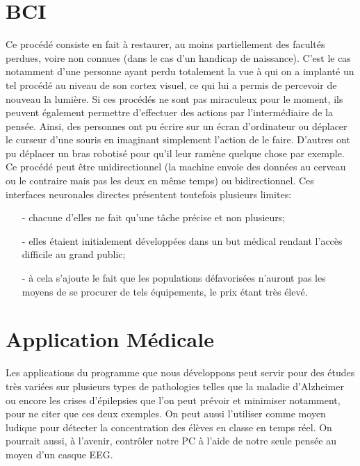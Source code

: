 	\section{BCI} %
		Ce procédé consiste en fait à restaurer, au moins partiellement des facultés perdues, voire non connues (dans le cas d'un handicap de naissance). C'est le cas notamment d'une personne ayant perdu totalement la vue à qui on a implanté un tel procédé au niveau de son cortex visuel, ce qui lui a permis de percevoir de nouveau la lumière. Si ces procédés ne sont pas miraculeux pour le moment, ils peuvent également permettre d'effectuer des actions par l'intermédiaire de la pensée. Ainsi, des personnes ont pu écrire sur un écran d'ordinateur ou déplacer le curseur d'une souris en imaginant simplement l'action de le faire. D'autres ont pu déplacer un bras robotisé pour qu'il leur ramène quelque chose par exemple.
	Ce procédé peut être unidirectionnel (la machine envoie des données au cerveau ou le contraire mais pas les deux en même temps) ou bidirectionnel.
	Ces interfaces neuronales directes présentent toutefois plusieurs limites:
	\begin{itemize}
		\item [-] chacune d'elles ne fait qu'une tâche précise et non plusieurs;
		\item [-] elles étaient initialement développées dans un but médical rendant l'accès difficile au grand public;
		\item [-] à cela s'ajoute le fait que les populations défavorisées n'auront pas les moyens de se procurer de tels équipements, le prix étant très élevé.
	\end{itemize}
	\label{sec:bci}
	\section{Application Médicale} %
		Les applications du programme que nous développons peut servir pour des études très variées sur plusieurs types de pathologies telles que la maladie d'Alzheimer ou encore les crises d'épilepsies que l'on peut prévoir et minimiser notamment, pour ne citer que ces deux exemples. On peut aussi l'utiliser comme moyen ludique pour détecter la concentration des élèves en classe en temps réel. On pourrait aussi, à l'avenir, contrôler notre PC à l'aide de notre seule pensée au moyen d'un casque EEG.
	\label{sec:application_médical}
	
				
	
	
	
	
